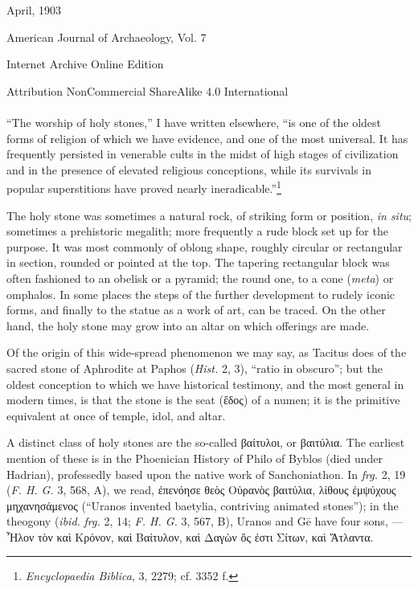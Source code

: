 \documentclass[a4paper, 12pt, oneside, polutonikogreek, english]{article}
\begin{document}
\begin{titlepage}
	\vspace*{\fill}%
	
	{\small April, 1903}%
	
	{\small American Journal of Archaeology, Vol. 7} %

	\vspace{1\baselineskip} %

    Internet Archive Online Edition  %
	
	{\small Attribution NonCommercial ShareAlike 4.0 International } %
\end{titlepage}
\clearpage
\pagestyle{fancy}
\fancyhf{}
\cfoot{\Fontauri{\thepage}}
\Large
\paragraph{}
``The worship of holy stones,'' I have written elsewhere, ``is one of the oldest forms of religion of which we have evidence, and one of the most universal. It has frequently persisted in venerable cults in the midst of high stages of civilization and in the presence of elevated religious conceptions, while its survivals in popular superstitions have proved nearly ineradicable.''\footnote{\emph{Encyclopaedia Biblica}, 3, 2279; cf. 3352 f.}

The holy stone was sometimes a natural rock, of striking form or position, \emph{in situ}; sometimes a prehistoric megalith; more frequently a rude block set up for the purpose. It was most commonly of oblong shape, roughly circular or rectangular in section, rounded or pointed at the top. The tapering rectangular block was often fashioned to an obelisk or a pyramid; the round one, to a cone (\emph{meta}) or omphalos. In some places the steps of the further development to rudely iconic forms, and finally to the statue as a work of art, can be traced. On the other hand, the holy stone may grow into an altar on which offerings are made.

Of the origin of this wide-spread phenomenon we may say, as Tacitus does of the sacred stone of Aphrodite at Paphos (\emph{Hist.} 2, 3), ``ratio in obscuro''; but the oldest conception to which we have historical testimony, and the most general in modern times, is that the stone is the seat (ἕδος) of a numen; it is the primitive equivalent at once of temple, idol, and altar.

A distinct class of holy stones are the so-called βαίτυλοι, or βαιτύλια. The earliest mention of these is in the Phoenician History of Philo of Byblos (died under Hadrian), professedly based upon the native work of Sanchoniathon. In \emph{frg.} 2, 19 (\emph{F. H. G.} 3, 568, A), we read, ἐπενόησε θεὸς Οὐρανὸς βαιτύλια, λίθους ἐμψύχους μηχανησάμενος (``Uranos invented baetylia, contriving animated stones''); in the theogony (\emph{ibid.} \emph{frg.} 2, 14; \emph{F. H. G.} 3, 567, B), Uranos and Gē have four sons, --- Ἦλον τὸν καὶ Κρόνον, καὶ Βαίτυλον, καὶ Δαγὼν ὅς ἐστι Σίτων, καὶ Ἄτλαντα.
\end{document}
